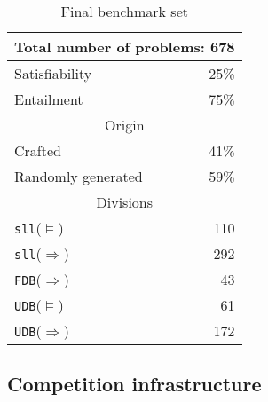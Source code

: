 \documentclass[twoside,11pt]{article}
\newcommand{\limp}{\Rightarrow}
\newcommand{\sllsat}{\texttt{sll}($\models$)}
\newcommand{\sllent}{\texttt{sll}($\limp$)}
\newcommand{\FDBent}{\texttt{FDB}($\limp$)}
\newcommand{\UDBsat}{\texttt{UDB}($\models$)}
\newcommand{\UDBent}{\texttt{UDB}($\limp$)}
\begin{document}
\begin{table}
\begin{center}
\begin{tabular}{p{6cm}r}\hline
\multicolumn{2}{c}{Total number of problems: 678} \\
\hline
Satisfiability & 25\% \\
Entailment & 75\% \\
\hline
%
\hline
\multicolumn{2}{c}{Origin} \\
\hline
Crafted & 41\% \\
Randomly generated & 59\% \\
\hline
%
\hline
\multicolumn{2}{c}{Divisions} \\
\hline
\sllsat & 110 \\ %
\sllent & 292 \\ %
\FDBent &  43 \\ %
\UDBsat &  61 \\ %
\UDBent & 172 \\
\hline
\end{tabular}
\end{center}
\caption{Final benchmark set}
\label{tab:bench}
\end{table}


\subsection{Competition infrastructure}
\end{document}
